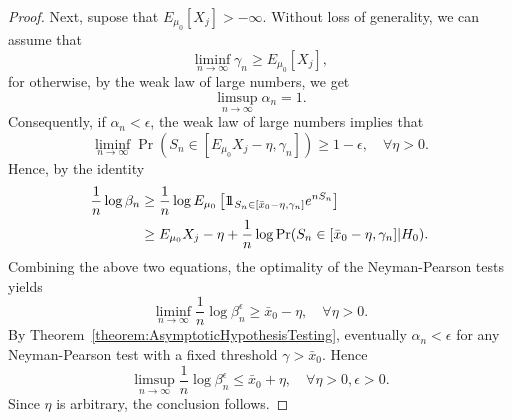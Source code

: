\begin{proof}
Next, supose that $E_{\mu_0} [X_j] > - \infty$.
Without loss of generality, we can assume that
\begin{equation*}
\liminf_{n \rightarrow \infty} \gamma_n \geq E_{\mu_0} [X_j],
\end{equation*}
for otherwise, by the weak law of large numbers, we get
\begin{equation*}
\limsup_{n \rightarrow \infty} \alpha_n = 1 .
\end{equation*}
Consequently, if $\alpha_n < \epsilon$, the weak law of large numbers implies that
\begin{equation*}
\liminf_{n \rightarrow \infty} \Pr (S_n \in [ E_{\mu_0} X_j - \eta, \gamma_n]) \geq 1 - \epsilon, \quad \forall \eta > 0 .
\end{equation*}
Hence, by the identity
\begin{equation*}
\begin{split}
\frac{1}{n} \log \beta_n
&\geq \frac{1}{n} \log E_{\mu_0} \left[ \mathrm{1\!\!1}_{ S_n \in [\bar{x}_0 - \eta, \gamma_n] }
e^{n S_n} \right] \\
&\geq E_{\mu_0} X_j - \eta + \frac{1}{n} \log \Pr (S_n \in [\bar{x}_0 - \eta, \gamma_n] | H_0) .
\end{split}
\end{equation*}
Combining the above two equations, the optimality of the Neyman-Pearson tests yields
\begin{equation*}
\liminf_{n \rightarrow \infty} \frac{1}{n} \log \beta_n^{\epsilon}
\geq \bar{x}_0 - \eta, \quad \forall \eta > 0 .
\end{equation*}
By Theorem~\ref{theorem:AsymptoticHypothesisTesting}, eventually $\alpha_n < \epsilon$ for any Neyman-Pearson test with a fixed threshold $\gamma > \bar{x}_0$.
Hence
\begin{equation*}
\limsup_{n \rightarrow \infty} \frac{1}{n} \log \beta_n^{\epsilon}
\leq \bar{x}_0 + \eta, \quad \forall \eta > 0, \epsilon > 0 .
\end{equation*}
Since $\eta$ is arbitrary, the conclusion follows.
\end{proof}

